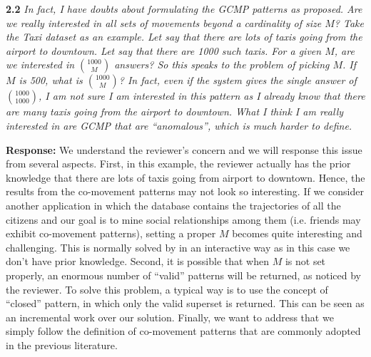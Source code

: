 \documentclass{vldb}
\begin{document}
{%
%
%
%
}



\textbf{2.2} \emph{In fact, I have doubts about formulating the GCMP patterns as proposed. Are
we really interested in all sets of movements beyond a cardinality of size $M$? 
Take the Taxi dataset as an example. Let say that there are lots of taxis going
from the airport to downtown. Let say that there are 1000 such taxis. For a
given $M$, are we interested in ${1000 \choose M}$ answers? 
So this speaks to the problem of picking $M$. If $M$ is 500, what is ${1000 \choose M}$? In fact, even if the
system gives the single answer of ${1000\choose 1000}$,
I am not sure I am
interested in this pattern as I already know that there are many taxis going from
the airport to downtown. What I think I am really interested in are GCMP that
are ``anomalous'', which is much harder to define.}

\textbf{Response:} We understand the reviewer's concern and we will response this issue from several aspects. First, in this example, the reviewer actually has the prior knowledge that there are lots of taxis going from airport to downtown. Hence, the results from the co-movement patterns may not look so interesting. If we consider another application in which the database contains the trajectories of all the citizens and our goal is to mine social relationships among them (i.e. friends may exhibit co-movement patterns), setting a proper $M$ becomes quite interesting and challenging. This is normally solved by in an interactive way as in this case we don't have prior knowledge. Second, it is possible that when $M$ is not set properly, an enormous number of ``valid'' patterns will be returned, as noticed by the reviewer. To solve this problem, a typical way is to use the concept of ``closed'' pattern, in which only the valid superset is returned. This can be seen as an incremental work over our solution. Finally, we want to address that we simply follow the definition of co-movement patterns that are commonly adopted in the previous literature.
\end{document}
